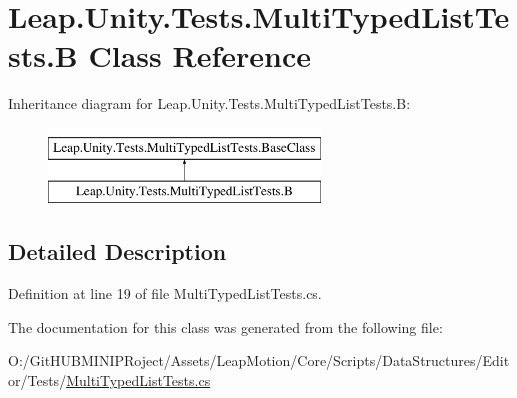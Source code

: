 \hypertarget{class_leap_1_1_unity_1_1_tests_1_1_multi_typed_list_tests_1_1_b}{}\section{Leap.\+Unity.\+Tests.\+Multi\+Typed\+List\+Tests.\+B Class Reference}
\label{class_leap_1_1_unity_1_1_tests_1_1_multi_typed_list_tests_1_1_b}
Inheritance diagram for Leap.\+Unity.\+Tests.\+Multi\+Typed\+List\+Tests.\+B\+:\begin{figure}[H]
\begin{center}
\leavevmode
\includegraphics[height=2.000000cm]{class_leap_1_1_unity_1_1_tests_1_1_multi_typed_list_tests_1_1_b}
\end{center}
\end{figure}


\subsection{Detailed Description}


Definition at line 19 of file Multi\+Typed\+List\+Tests.\+cs.



The documentation for this class was generated from the following file\+:\begin{DoxyCompactItemize}
\item 
O\+:/\+Git\+H\+U\+B\+M\+I\+N\+I\+P\+Roject/\+Assets/\+Leap\+Motion/\+Core/\+Scripts/\+Data\+Structures/\+Editor/\+Tests/\mbox{\hyperlink{_multi_typed_list_tests_8cs}{Multi\+Typed\+List\+Tests.\+cs}}\end{DoxyCompactItemize}
